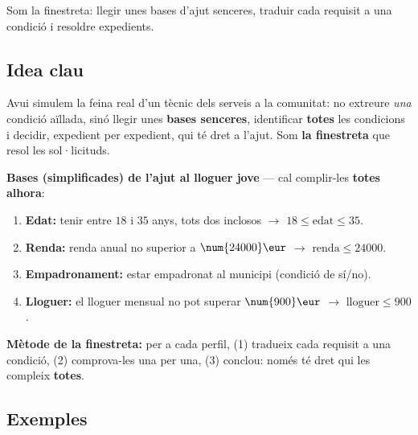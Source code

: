 %
{Som la finestreta: llegir unes bases d'ajut senceres, traduir cada requisit a una condició i resoldre expedients.}

\subsection{Idea clau}

Avui simulem la feina real d'un tècnic dels serveis a la comunitat: no extreure
\emph{una} condició aïllada, sinó llegir unes \textbf{bases senceres}, identificar
\textbf{totes} les condicions i decidir, expedient per expedient, qui té dret a
l'ajut. Som \textbf{la finestreta} que resol les sol·licituds.

\begin{idea}
\textbf{Bases (simplificades) de l'ajut al lloguer jove} — cal complir-les
\textbf{totes alhora}:
\begin{enumerate}[leftmargin=1.6em, itemsep=2pt]
  \item \textbf{Edat:} tenir entre $18$ i $35$ anys, tots dos inclosos $\rightarrow$
        $18\le \text{edat}\le 35$.
  \item \textbf{Renda:} renda anual no superior a $\num{24000}\eur$ $\rightarrow$
        $\text{renda}\le\num{24000}$.
  \item \textbf{Empadronament:} estar empadronat al municipi (condició de sí/no).
  \item \textbf{Lloguer:} el lloguer mensual no pot superar $\num{900}\eur$
        $\rightarrow$ $\text{lloguer}\le 900$.
\end{enumerate}
\textbf{Mètode de la finestreta:} per a cada perfil, (1) tradueix cada requisit a una
condició, (2) comprova-les una per una, (3) conclou: només té dret qui les compleix
\textbf{totes}.
\end{idea}

\subsection{Exemples}

